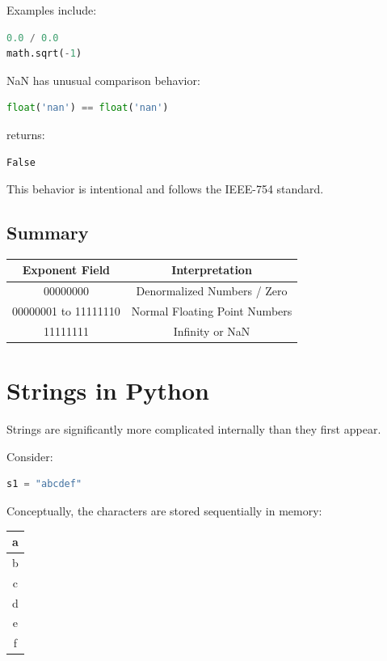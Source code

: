 \documentclass[11pt]{article}
\begin{document}
Examples include:

\begin{lstlisting}[language=Python]
0.0 / 0.0
math.sqrt(-1)
\end{lstlisting}

NaN has unusual comparison behavior:

\begin{lstlisting}[language=Python]
float('nan') == float('nan')
\end{lstlisting}

returns:

\begin{lstlisting}
False
\end{lstlisting}

This behavior is intentional and follows the IEEE-754 standard.

\subsection{Summary}

\begin{center}
\begin{tabular}{|c|c|}
\hline
Exponent Field & Interpretation \\
\hline
00000000 & Denormalized Numbers / Zero \\
00000001 to 11111110 & Normal Floating Point Numbers \\
11111111 & Infinity or NaN \\
\hline
\end{tabular}
\end{center}

\section{Strings in Python}

Strings are significantly more complicated internally than they first appear.

Consider:

\begin{lstlisting}[language=Python]
s1 = "abcdef"
\end{lstlisting}

Conceptually, the characters are stored sequentially in memory:

\begin{center}
\begin{tabular}{|c|}
\hline
a \\
\hline
b \\
\hline
c \\
\hline
d \\
\hline
e \\
\hline
f \\
\hline
\end{tabular}
\end{center}
\end{document}
